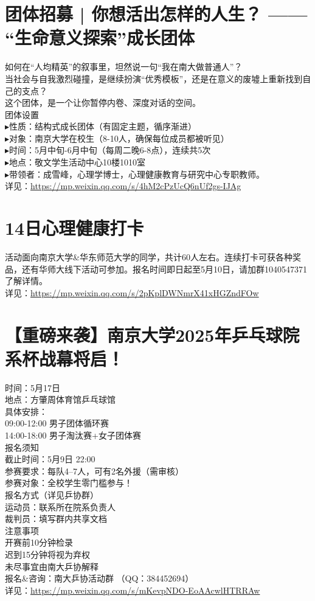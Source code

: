 \documentclass[letterpaper, 12pt]{article}
\begin{document}
\begin{multicols}{2}
\section{团体招募 | 你想活出怎样的人生？ —— “生命意义探索”成长团体} %
如何在“人均精英”的叙事里，坦然说一句“我在南大做普通人”？
\\当社会与自我激烈碰撞，是继续扮演“优秀模板”，还是在意义的废墟上重新找到自己的支点？
\\这个团体，是一个让你暂停内卷、深度对话的空间。
\\团体设置
\\▸性质：结构式成长团体（有固定主题，循序渐进）
\\▸对象：南京大学在校生（8-10人，确保每位成员都被听见）
\\▸时间：5月中旬-6月中旬（每周二晚6-8点），连续共5次
\\▸地点：敬文学生活动中心10楼1010室
\\▸带领者：成雪峰，心理学博士，心理健康教育与研究中心专职教师。
\\详见：\url{https://mp.weixin.qq.com/s/4hM2cPzUcQ6nUf2gs-IJAg}

\section{14日心理健康打卡} %
活动面向南京大学\&华东师范大学的同学，共计60⼈左右。连续打卡可获各种奖品，还有华师大线下活动可参加。报名时间即日起至5月10日，请加群1040547371了解详情。
\\详见：\url{https://mp.weixin.qq.com/s/2pKplDWNmrX41xHGZndFOw}

\section{【重磅来袭】南京大学2025年乒乓球院系杯战幕将启！} %
时间：5月17日
\\地点：方肇周体育馆乒乓球馆
\\具体安排：
\\    09:00-12:00  男子团体循环赛
\\    14:00-18:00 男子淘汰赛+女子团体赛
\\报名须知
\\截止时间：5月9日 22:00
\\参赛要求：每队4–7人，可有2名外援（需审核）
\\参赛对象：全校学生零门槛参与！
\\报名方式（详见乒协群）
\\运动员：联系所在院系负责人
\\裁判员：填写群内共享文档
\\注意事项
\\开赛前10分钟检录
\\迟到15分钟将视为弃权
\\未尽事宜由南大乒协解释
\\报名\&咨询：南大乒协活动群 （QQ：384452694）
\\详见：\url{https://mp.weixin.qq.com/s/mKevpNDO-EoAAcwlHTRRAw}


\end{multicols}
\end{document}
